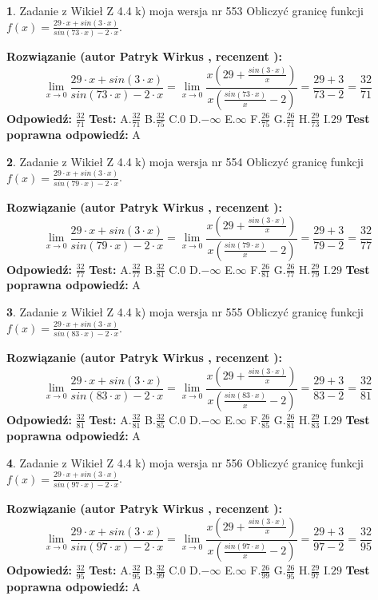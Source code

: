 \documentclass[12pt, a4paper]{article}
\theoremstyle{definition} %
\newtheorem{zad}{}
\newcommand{\zadStart}[1]{\begin{zad}#1\newline}
\newcommand{\zadStop}{\end{zad}}
\newcommand{\rozwStart}[2]{\noindent \textbf{Rozwiązanie (autor #1 , recenzent #2): }\newline}
\newcommand{\rozwStop}{\newline}
\newcommand{\odpStart}{\noindent \textbf{Odpowiedź:}\newline}
\newcommand{\odpStop}{\newline}
\newcommand{\testStart}{\noindent \textbf{Test:}\newline}
\newcommand{\testStop}{\newline}
\newcommand{\kluczStart}{\noindent \textbf{Test poprawna odpowiedź:}\newline}
\newcommand{\kluczStop}{\newline}
\begin{document}
\zadStart{Zadanie z Wikieł Z 4.4 k) moja wersja nr 553}
Obliczyć granicę funkcji $f(x)=\frac{29\cdot x +sin(3\cdot x)}{sin(73\cdot x) -2\cdot x}$.
\zadStop
\rozwStart{Patryk Wirkus}{}
$$\lim\limits_{x\to 0}\frac{29\cdot x +sin(3\cdot x)}{sin(73\cdot x) -2\cdot x}
=\lim\limits_{x\to 0}\frac{x(29+\frac{sin(3\cdot x)}{x})}{x(\frac{sin(73\cdot x)}{x}-2)}
=\frac{29+3}{73-2} = \frac{32}{71}$$
\rozwStop
\odpStart
$\frac{32}{71}$
\odpStop
\testStart
A.$\frac{32}{71}$
B.$\frac{32}{75}$
C.$0$
D.$-\infty$
E.$\infty$
F.$\frac{26}{75}$
G.$\frac{26}{71}$
H.$\frac{29}{73}$
I.$29$
\testStop
\kluczStart
A
\kluczStop



\zadStart{Zadanie z Wikieł Z 4.4 k) moja wersja nr 554}
Obliczyć granicę funkcji $f(x)=\frac{29\cdot x +sin(3\cdot x)}{sin(79\cdot x) -2\cdot x}$.
\zadStop
\rozwStart{Patryk Wirkus}{}
$$\lim\limits_{x\to 0}\frac{29\cdot x +sin(3\cdot x)}{sin(79\cdot x) -2\cdot x}
=\lim\limits_{x\to 0}\frac{x(29+\frac{sin(3\cdot x)}{x})}{x(\frac{sin(79\cdot x)}{x}-2)}
=\frac{29+3}{79-2} = \frac{32}{77}$$
\rozwStop
\odpStart
$\frac{32}{77}$
\odpStop
\testStart
A.$\frac{32}{77}$
B.$\frac{32}{81}$
C.$0$
D.$-\infty$
E.$\infty$
F.$\frac{26}{81}$
G.$\frac{26}{77}$
H.$\frac{29}{79}$
I.$29$
\testStop
\kluczStart
A
\kluczStop



\zadStart{Zadanie z Wikieł Z 4.4 k) moja wersja nr 555}
Obliczyć granicę funkcji $f(x)=\frac{29\cdot x +sin(3\cdot x)}{sin(83\cdot x) -2\cdot x}$.
\zadStop
\rozwStart{Patryk Wirkus}{}
$$\lim\limits_{x\to 0}\frac{29\cdot x +sin(3\cdot x)}{sin(83\cdot x) -2\cdot x}
=\lim\limits_{x\to 0}\frac{x(29+\frac{sin(3\cdot x)}{x})}{x(\frac{sin(83\cdot x)}{x}-2)}
=\frac{29+3}{83-2} = \frac{32}{81}$$
\rozwStop
\odpStart
$\frac{32}{81}$
\odpStop
\testStart
A.$\frac{32}{81}$
B.$\frac{32}{85}$
C.$0$
D.$-\infty$
E.$\infty$
F.$\frac{26}{85}$
G.$\frac{26}{81}$
H.$\frac{29}{83}$
I.$29$
\testStop
\kluczStart
A
\kluczStop



\zadStart{Zadanie z Wikieł Z 4.4 k) moja wersja nr 556}
Obliczyć granicę funkcji $f(x)=\frac{29\cdot x +sin(3\cdot x)}{sin(97\cdot x) -2\cdot x}$.
\zadStop
\rozwStart{Patryk Wirkus}{}
$$\lim\limits_{x\to 0}\frac{29\cdot x +sin(3\cdot x)}{sin(97\cdot x) -2\cdot x}
=\lim\limits_{x\to 0}\frac{x(29+\frac{sin(3\cdot x)}{x})}{x(\frac{sin(97\cdot x)}{x}-2)}
=\frac{29+3}{97-2} = \frac{32}{95}$$
\rozwStop
\odpStart
$\frac{32}{95}$
\odpStop
\testStart
A.$\frac{32}{95}$
B.$\frac{32}{99}$
C.$0$
D.$-\infty$
E.$\infty$
F.$\frac{26}{99}$
G.$\frac{26}{95}$
H.$\frac{29}{97}$
I.$29$
\testStop
\kluczStart
A
\kluczStop
\end{document}
